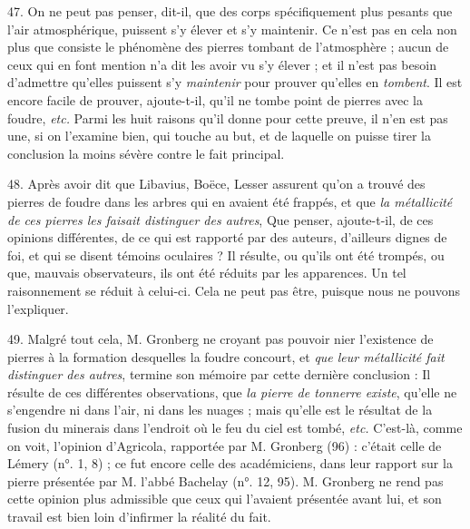 \documentclass[a4paper, 11pt, oneside, polutonikogreek, french]{article}
\begin{document}
47. \og On ne peut pas penser, dit-il, que des corps spécifiquement plus pesants que l'air atmosphérique, puissent s'y élever et s'y maintenir. \fg Ce n'est pas en cela non plus que consiste le phénomène des pierres tombant de l'atmosphère ; aucun de ceux qui en font mention n'a dit les avoir vu s'y élever ; et il n'est pas besoin d'admettre qu'elles puissent s'y \emph{maintenir} pour prouver qu'elles en \emph{tombent}. Il est encore facile de prouver, ajoute-t-il, qu'il ne tombe point de pierres avec la foudre, \emph{etc.} Parmi les huit raisons qu'il donne pour cette preuve, il n'en est pas une, si on l'examine bien, qui touche au but, et de laquelle on puisse tirer la conclusion la moins sévère contre le fait principal.

48. Après avoir dit que Libavius, Boëce, Lesser assurent qu'on a trouvé des pierres de foudre dans les arbres qui en avaient été frappés, et que \emph{la métallicité de ces pierres les faisait distinguer des autres}, \og Que penser, ajoute-t-il, de ces opinions différentes, de ce qui est rapporté par des auteurs, d'ailleurs dignes de foi, et qui se disent témoins oculaires ? Il résulte, ou qu'ils ont été trompés, ou que, mauvais observateurs, ils ont été réduits par les apparences. \fg Un tel raisonnement se réduit à celui-ci. Cela ne peut pas être, puisque nous ne pouvons l'expliquer.

49. Malgré tout cela, M. Gronberg ne croyant pas pouvoir nier l'existence de pierres à la formation desquelles la foudre concourt, et \emph{que leur métallicité fait distinguer des autres}, termine son mémoire par cette dernière conclusion : \og Il résulte de ces différentes observations, que \emph{la pierre de tonnerre existe}, qu'elle ne s'engendre ni dans l'air, ni dans les nuages ; mais qu'elle est le résultat de la fusion du minerais dans l'endroit où le feu du ciel est tombé, \emph{etc.} \fg C'est-là, comme on voit, l'opinion d'Agricola, rapportée par M. Gronberg (96) : c'était celle de Lémery (n°. 1, 8) ; ce fut encore celle des académiciens, dans leur rapport sur la pierre présentée par M. l'abbé Bachelay (n°. 12, 95). M. Gronberg ne rend pas cette opinion plus admissible que ceux qui l'avaient présentée avant lui, et son travail est bien loin d'infirmer la réalité du fait.
\end{document}
